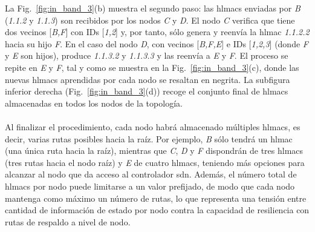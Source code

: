 La Fig.~\ref{fig:in_band_3}(b) muestra el segundo paso: las \glspl{hlmac} enviadas por \textit{B} (\textit{1.1.2} y \textit{1.1.3}) son recibidos por los nodos \textit{C} y \textit{D}. El nodo \textit{C} verifica que tiene dos vecinos [\textit{B,F}] con IDs [\textit{1,2}] y, por tanto, sólo genera y reenvía la \gls{hlmac} \textit{1.1.2.2} hacia su hijo \textit{F}. En el caso del nodo \textit{D}, con vecinos [\textit{B,F,E}] e IDs [\textit{1,2,3}] (donde \textit{F} y \textit{E} son hijos), produce \textit{1.1.3.2} y \textit{1.1.3.3} y las reenvía a \textit{E} y \textit{F}. El proceso se repite en \textit{E} y \textit{F}, tal y como se muestra en la Fig.~\ref{fig:in_band_3}(c), donde las nuevas \glspl{hlmac} aprendidas por cada nodo se resaltan en negrita. La subfigura inferior derecha (Fig.~\ref{fig:in_band_3}(d)) recoge el conjunto final de \glspl{hlmac} almacenadas en todos los nodos de la topología.\\
\\
Al finalizar el procedimiento, cada nodo habrá almacenado múltiples \glspl{hlmac}, es decir, varias rutas posibles hacia la raíz. Por ejemplo, \textit{B} sólo tendrá un \gls{hlmac} (una única ruta hacia la raíz), mientras que \textit{C}, \textit{D} y \textit{F} dispondrán de tres \glspl{hlmac} (tres rutas hacia el nodo raíz) y \textit{E} de cuatro \glspl{hlmac}, teniendo más opciones para alcanzar al nodo que da acceso al controlador \gls{sdn}. Además, el número total de \glspl{hlmac} por nodo puede limitarse a un valor prefijado, de modo que cada nodo mantenga como máximo un número de rutas, lo que representa una tensión entre cantidad de información de estado por nodo contra la capacidad de resiliencia con rutas de respaldo a nivel de nodo. 

